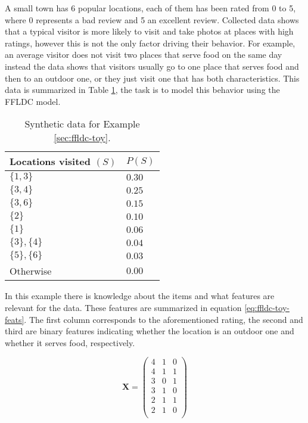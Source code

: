 A small town has 6 popular locations, each of them has been rated from 0 to 5, where 0 represents a bad review and 5 an excellent review. Collected data shows that a typical visitor is more likely to visit and take photos at places with high ratings, however this is not the only factor driving their behavior. For example, an average visitor does not visit two places that serve food on the same day instead the data shows that visitors usually go to one place that serves food and then to an outdoor one, or they just visit one that has both characteristics. This data is summarized in Table \ref{tab:ffldc-toy-probs}, the task is to model this behavior using the FFLDC model.

\begin{table}
  \centering
  \caption{Synthetic data for Example \ref{sec:ffldc-toy}.}
  \begin{tabular}{@{}ll@{}}
    \toprule
    Locations visited $(S)$ & $P(S)$  \\
    \midrule
    $\{1,3\}$ & $0.30$ \\
    $\{3,4\}$ & $0.25$ \\
    $\{3,6\}$ & $0.15$ \\
    $\{2\}$ & $0.10$ \\
    $\{1\}$ & $0.06$ \\
    $\{3\}, \{4\}$ & $0.04$ \\
    $\{5\}, \{6\}$ & $0.03$ \\
    Otherwise & $0.00$ \\
    \bottomrule
  \end{tabular}
  \label{tab:ffldc-toy-probs}
\end{table}

In this example there is knowledge about the items and what features are relevant for the data. These features are summarized in equation \eqref{eq:ffldc-toy-feats}. The first column corresponds to the aforementioned rating, the second and third are binary features indicating whether the location is an outdoor one and whether it serves food, respectively.

\begin{equation}
  \mathbf{X} = \left(
    \begin{array}{ccc}
      4 & 1 & 0 \\
      4 & 1 & 1 \\
      3 & 0 & 1 \\
      3 & 1 & 0 \\
      2 & 1 & 1 \\
      2 & 1 & 0  \\
     \end{array}
  \right)
  \label{eq:ffldc-toy-feats}
\end{equation}

